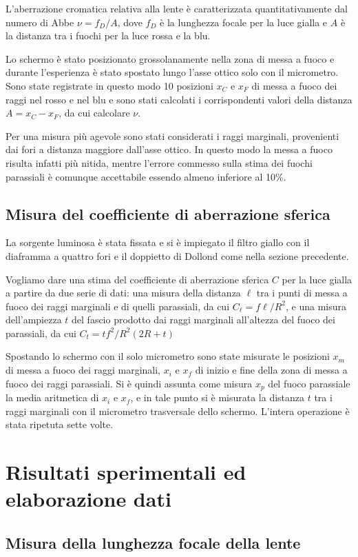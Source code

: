 \documentclass[italian,a4paper]{article}
\begin{document}
L'aberrazione cromatica relativa alla lente è caratterizzata quantitativamente dal numero di Abbe $\nu=f_D/A$, dove $f_D$ è la lunghezza focale per la luce gialla e $A$ è la distanza tra i fuochi per la luce rossa e la blu.

Lo schermo è stato posizionato grossolanamente nella zona di messa a fuoco e durante l'esperienza è stato spostato lungo l'asse ottico solo con il micrometro. Sono state registrate in questo modo 10 posizioni $x_C$ e $x_F$ di messa a fuoco dei raggi nel rosso e nel blu e sono stati calcolati i corrispondenti valori della distanza $A=x_C-x_F$, da cui calcolare $\nu$.

Per una misura più agevole sono stati considerati i raggi marginali, provenienti dai fori a distanza maggiore dall'asse ottico. In questo modo la messa a fuoco risulta infatti più nitida, mentre l'errore commesso sulla stima dei fuochi parassiali è comunque accettabile essendo almeno inferiore al 10\%.
\subsection{Misura del coefficiente di aberrazione sferica}
La sorgente luminosa è stata fissata e si è impiegato il filtro giallo con il diaframma a quattro fori e il doppietto di Dollond come nella sezione precedente.

Vogliamo dare una stima del coefficiente di aberrazione sferica $C$ per la luce gialla a partire da due serie di dati: una misura della distanza $\ell$ tra i punti di messa a fuoco dei raggi marginali e di quelli parassiali, da cui $C_\ell=f\ell/R^2$, e una misura dell'ampiezza $t$ del fascio prodotto dai raggi marginali all'altezza del fuoco dei parassiali, da cui $C_t=tf^2/R^2(2R+t)$

Spostando lo schermo con il solo micrometro sono state misurate le posizioni $x_m$ di messa a fuoco dei raggi marginali, $x_i$ e $x_f$ di inizio e fine della zona di messa a fuoco dei raggi parassiali. Si è quindi assunta come misura $x_p$ del fuoco parassiale la media aritmetica di $x_i$ e $x_f$, e in tale punto si è misurata la distanza $t$ tra i raggi marginali con il micrometro trasversale dello schermo. L'intera operazione è stata ripetuta sette volte.
\section{Risultati sperimentali ed elaborazione dati}
\subsection{Misura della lunghezza focale della lente}
\end{document}
